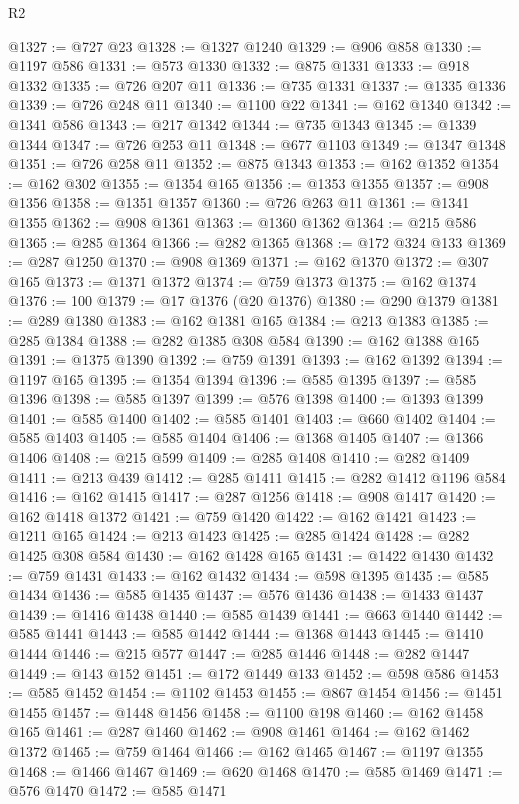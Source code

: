 \begin{lexlean}{R2}
\begin{coremodule}
@1327 := @727 @23
@1328 := @1327 @1240
@1329 := @906 @858
@1330 := @1197 @586
@1331 := @573 @1330
@1332 := @875 @1331
@1333 := @918 @1332
@1335 := @726 @207 @11
@1336 := @735 @1331
@1337 := @1335 @1336
@1339 := @726 @248 @11
@1340 := @1100 @22
@1341 := @162 @1340
@1342 := @1341 @586
@1343 := @217 @1342
@1344 := @735 @1343
@1345 := @1339 @1344
@1347 := @726 @253 @11
@1348 := @677 @1103
@1349 := @1347 @1348
@1351 := @726 @258 @11
@1352 := @875 @1343
@1353 := @162 @1352
@1354 := @162 @302
@1355 := @1354 @165
@1356 := @1353 @1355
@1357 := @908 @1356
@1358 := @1351 @1357
@1360 := @726 @263 @11
@1361 := @1341 @1355
@1362 := @908 @1361
@1363 := @1360 @1362
@1364 := @215 @586
@1365 := @285 @1364
@1366 := @282 @1365
@1368 := @172 @324 @133
@1369 := @287 @1250
@1370 := @908 @1369
@1371 := @162 @1370
@1372 := @307 @165
@1373 := @1371 @1372
@1374 := @759 @1373
@1375 := @162 @1374
@1376 := 100
@1379 := @17 @1376 (@20 @1376)
@1380 := @290 @1379
@1381 := @289 @1380
@1383 := @162 @1381 @165
@1384 := @213 @1383
@1385 := @285 @1384
@1388 := @282 @1385 @308 @584
@1390 := @162 @1388 @165
@1391 := @1375 @1390
@1392 := @759 @1391
@1393 := @162 @1392
@1394 := @1197 @165
@1395 := @1354 @1394
@1396 := @585 @1395
@1397 := @585 @1396
@1398 := @585 @1397
@1399 := @576 @1398
@1400 := @1393 @1399
@1401 := @585 @1400
@1402 := @585 @1401
@1403 := @660 @1402
@1404 := @585 @1403
@1405 := @585 @1404
@1406 := @1368 @1405
@1407 := @1366 @1406
@1408 := @215 @599
@1409 := @285 @1408
@1410 := @282 @1409
@1411 := @213 @439
@1412 := @285 @1411
@1415 := @282 @1412 @1196 @584
@1416 := @162 @1415
@1417 := @287 @1256
@1418 := @908 @1417
@1420 := @162 @1418 @1372
@1421 := @759 @1420
@1422 := @162 @1421
@1423 := @1211 @165
@1424 := @213 @1423
@1425 := @285 @1424
@1428 := @282 @1425 @308 @584
@1430 := @162 @1428 @165
@1431 := @1422 @1430
@1432 := @759 @1431
@1433 := @162 @1432
@1434 := @598 @1395
@1435 := @585 @1434
@1436 := @585 @1435
@1437 := @576 @1436
@1438 := @1433 @1437
@1439 := @1416 @1438
@1440 := @585 @1439
@1441 := @663 @1440
@1442 := @585 @1441
@1443 := @585 @1442
@1444 := @1368 @1443
@1445 := @1410 @1444
@1446 := @215 @577
@1447 := @285 @1446
@1448 := @282 @1447
@1449 := @143 @152
@1451 := @172 @1449 @133
@1452 := @598 @586
@1453 := @585 @1452
@1454 := @1102 @1453
@1455 := @867 @1454
@1456 := @1451 @1455
@1457 := @1448 @1456
@1458 := @1100 @198
@1460 := @162 @1458 @165
@1461 := @287 @1460
@1462 := @908 @1461
@1464 := @162 @1462 @1372
@1465 := @759 @1464
@1466 := @162 @1465
@1467 := @1197 @1355
@1468 := @1466 @1467
@1469 := @620 @1468
@1470 := @585 @1469
@1471 := @576 @1470
@1472 := @585 @1471

\end{coremodule}
\end{lexlean}
